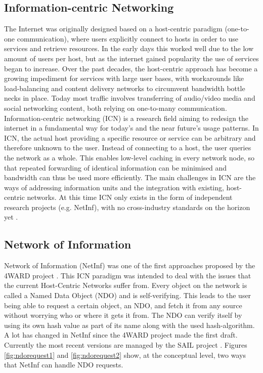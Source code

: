 \subsection{Information-centric Networking}
\label{sec:netinf}
The Internet was originally designed based on a host-centric paradigm 
(one-to-one communication), where users explicitly connect to hosts 
in order to use services and retrieve resources. In the early days 
this worked well due to the low amount of users per host, but as the 
internet gained popularity the use of services began to increase. 
Over the past decades, the host-centric approach has become a 
growing impediment for services with large user bases, with workarounds 
like load-balancing and content delivery networks to circumvent 
bandwidth bottle necks in place. Today most traffic involves 
transferring of audio/video media and social networking content,
 both relying on one-to-many communication. Information-centric
 networking (ICN) is a research field aiming to redesign the internet
 in a fundamental way for today's and the near future's usage patterns. 
In ICN, the actual host providing a specific resource or service can
 be arbitrary and therefore unknown to the user. Instead of connecting 
to a host, the user queries the network as a whole. This enables 
low-level caching in every network node, so that repeated forwarding 
of identical information can be minimised and bandwidth can thus be used more
 efficiently. The main challenges in ICN are the ways of addressing 
information units and the integration with existing, host-centric networks. 
At this time ICN only exists in the form of independent research projects 
(e.g. NetInf), with no cross-industry standards on the horizon
 yet \cite{ICNarticle}. 


\subsection{Network of Information}
Network of Information (NetInf) was one of the first approaches proposed 
by the 4WARD project \cite{4ward}. This ICN paradigm was intended to deal 
with the issues that the current Host-Centric Networks suffer from. Every 
object on the network is called a Named Data Object (NDO) and is self-verifying.
 This leads to the user being able to request a certain object, an NDO, 
and fetch it from any source without worrying who or where it gets it from.
 The NDO can verify itself by using its own hash value as part of its name
 along with the used hash-algorithm.
A lot has changed in NetInf since the 4WARD project made the first draft. 
Currently the most recent versions are managed by the SAIL project \cite{sail}. Figures \ref{fig:ndorequest1} and \ref{fig:ndorequest2} show, at the conceptual level, two ways that NetInf can handle NDO requests.

